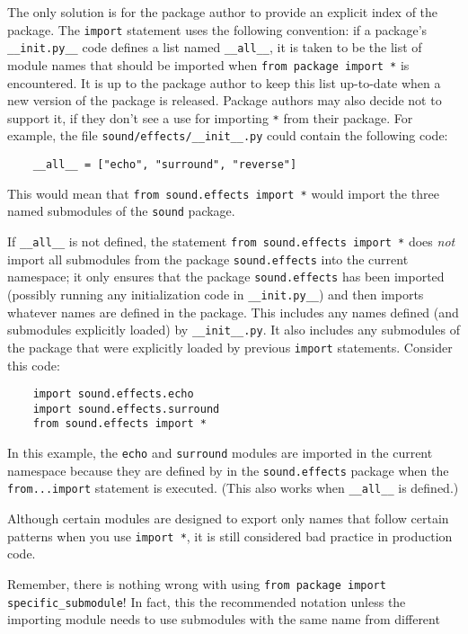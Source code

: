 \documentclass[UTF8]{article}
\begin{document}
The only solution is for the package author to provide an explicit index of the package. The
\texttt{import} statement uses the following convention: if a package's
\texttt{__init.py__} code defines a list named \texttt{__all__}, it is
taken to be the list of module names that should be imported when
\texttt{from package import *} is encountered. It is up to the package author to keep
this list up-to-date when a new version of the package is released. Package authors may also decide
not to support it, if they don't see a use for importing \texttt{*} from their package. For example,
the file \texttt{sound/effects/\_\_init\_\_.py} could contain the following code:
\begin{verbatim}
    __all__ = ["echo", "surround", "reverse"]
\end{verbatim}

This would mean that \texttt{from sound.effects import *} would import the three named
submodules of the \texttt{sound} package.

If \texttt{\_\_all\_\_} is not defined, the statement \texttt{from sound.effects import
*} does \emph{not} import all submodules from the package \texttt{sound.effects} into the current
namespace; it only ensures that the package \texttt{sound.effects} has been imported (possibly
running any initialization code in \texttt{\_\_init.py\_\_}) and then imports whatever names are
defined in the package. This includes any names defined (and submodules explicitly loaded) by
\texttt{\_\_init\_\_.py}. It also includes any submodules of the package that were explicitly
loaded by previous \texttt{import} statements. Consider this code:
\begin{verbatim}
    import sound.effects.echo
    import sound.effects.surround
    from sound.effects import *
\end{verbatim}
In this example, the \texttt{echo} and \texttt{surround} modules are imported in the current
namespace because they are defined by in the \texttt{sound.effects} package when the
\texttt{from...import} statement is executed. (This also works when
\texttt{\_\_all\_\_} is defined.)

Although certain modules are designed to export only names that follow certain patterns when you
use \texttt{import *}, it is still considered bad practice in production code.

Remember, there is nothing wrong with using \texttt{from package import
specific_submodule}! In fact, this the recommended notation unless the importing module needs to
use submodules with the same name from different packages.
\end{document}
